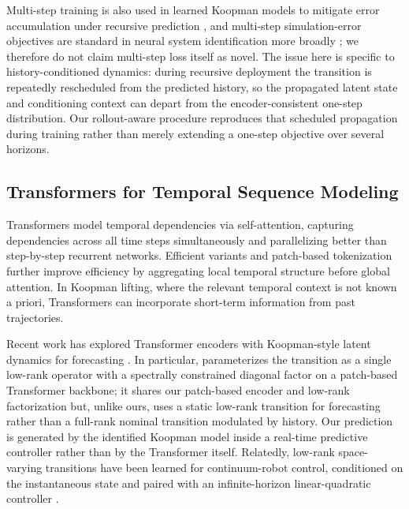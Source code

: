Multi-step training is also used in learned Koopman models to mitigate error accumulation under recursive prediction \cite{lusch2018deep, otto2019linearly, azencot2020forecasting, wu2026multistep}, and multi-step simulation-error objectives are standard in neural system identification more broadly \cite{forgione2021dynonet}; we therefore do not claim multi-step loss itself as novel. The issue here is specific to history-conditioned dynamics: during recursive deployment the transition is repeatedly rescheduled from the predicted history, so the propagated latent state and conditioning context can depart from the encoder-consistent one-step distribution. Our rollout-aware procedure reproduces that scheduled propagation during training rather than merely extending a one-step objective over several horizons.

\subsection{Transformers for Temporal Sequence Modeling}

Transformers \cite{vaswani2017attention} model temporal dependencies via self-attention, capturing dependencies across all time steps simultaneously and parallelizing better than step-by-step recurrent networks. Efficient variants and patch-based tokenization \cite{zhou2021informer, wang2020linformer, choromanski2021performer, wu2021autoformer, zhou2022fedformer, nie2023time} further improve efficiency by aggregating local temporal structure before global attention. In Koopman lifting, where the relevant temporal context is not known a priori, Transformers can incorporate short-term information from past trajectories.

Recent work has explored Transformer encoders with Koopman-style latent dynamics for forecasting \cite{forootani2026deepkoopformer, forootani2026spectral}. In particular, \cite{forootani2026spectral} parameterizes the transition as a single low-rank operator with a spectrally constrained diagonal factor on a patch-based Transformer backbone; it shares our patch-based encoder and low-rank factorization but, unlike ours, uses a static low-rank transition for forecasting rather than a full-rank nominal transition modulated by history. Our prediction is generated by the identified Koopman model inside a real-time predictive controller rather than by the Transformer itself. Relatedly, low-rank space-varying transitions have been learned for continuum-robot control, conditioned on the instantaneous state and paired with an infinite-horizon linear-quadratic controller \cite{feizi2025deepkoopman}.

